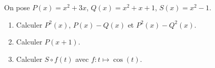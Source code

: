 
\begin{exercice}  \;
On pose $P(x)=x^2+3x$, $Q(x)=x^2+x+1$, $S(x)=x^2-1$.
\begin{enumerate}
 \item Calculer $P^2(x)$, $P(x)-Q(x)$ et $P^2(x)-Q^2(x)$.
\item Calculer $P(x+1)$.
\item Calculer $S\circ f(t)$ avec $f: t\mapsto \cos{(t)}$.
\end{enumerate}
\end{exercice}